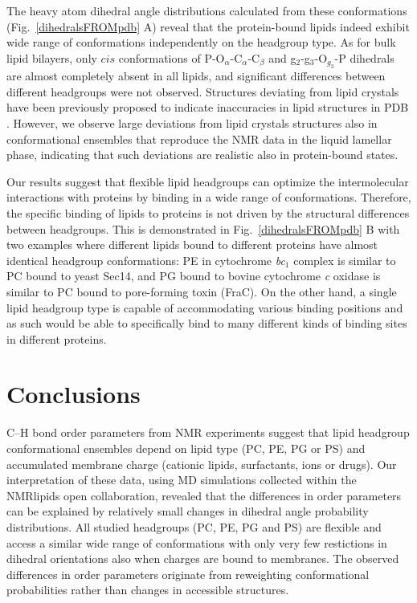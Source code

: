 \documentclass[aps,prl,superscriptaddress,twocolumn]{revtex4}
\begin{document}
The heavy atom dihedral angle distributions calculated from these conformations 
(Fig.~\ref{dihedralsFROMpdb} A) reveal that the protein-bound lipids indeed exhibit wide
range of conformations independently on the headgroup type.
As for bulk lipid bilayers, only $cis$ conformations
of P-O$_\alpha$-C$_\alpha$-C$_\beta$ and g$_2$-g$_3$-O$_{g_3}$-P dihedrals are almost
completely absent in all lipids, and significant differences between
different headgroups were not observed.
Structures deviating from lipid crystals 
have been previously proposed to indicate inaccuracies in lipid structures in PDB \cite{marsh13b,pezeshkian18}. 
However, we observe large deviations from lipid crystals structures also in conformational ensembles
that reproduce the NMR data in the liquid lamellar phase, indicating that such deviations
are realistic also in protein-bound states.


Our results suggest that flexible lipid headgroups can optimize the intermolecular interactions with proteins by binding
in a wide range of conformations.
Therefore, the specific binding of lipids to proteins is not driven by the structural differences between headgroups.
This is demonstrated in Fig.~\ref{dihedralsFROMpdb} B with two examples where different lipids bound to
different proteins have almost identical headgroup conformations:
PE in cytochrome {\it bc}$_1$ complex is similar to PC bound to yeast Sec14,
and PG bound to bovine cytochrome {\it c} oxidase is similar to PC bound to pore-forming toxin (FraC).
On the other hand, a single lipid headgroup type is capable of accommodating various binding positions and as such would 
be able to specifically bind to many different kinds of binding sites in different proteins.



\section{Conclusions}

C--H bond order parameters from NMR experiments %
suggest that lipid headgroup conformational ensembles depend on lipid type (PC, PE, PG or PS) 
and accumulated membrane charge (cationic lipids, surfactants, ions or drugs). 
Our interpretation of these data, using MD simulations collected
within the NMRlipids open collaboration,
revealed that the differences in order parameters can be explained
by relatively small changes in dihedral angle probability distributions.
All studied headgroups (PC, PE, PG and PS) are flexible
and access a similar wide range of conformations with only very few restictions in dihedral orientations
also when charges are bound to membranes.
The observed differences in order parameters originate from
reweighting conformational probabilities rather than changes in accessible structures.
\end{document}
